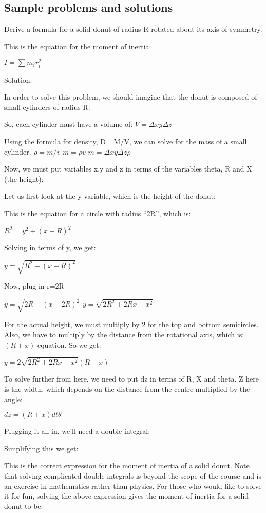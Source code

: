 \subsection{Sample problems and solutions}

\begin{example}{Derive a formula for a solid donut of radius R rotated about its axis of symmetry.}


This is the equation for the moment of inertia:

$I=\sum m_ir_i^{2}$

Solution:

In order to solve this problem, we should imagine that the donut is composed of small cylinders of radius R:


So, each cylinder must have a volume of: $V=\Delta xy\Delta z$

Using the formula for density, D= M/V, we can solve for the mass of a small cylinder.
$\rho=m/v$
$m=\rho v$
$m=\Delta xy\Delta z\rho$

Now, we must put variables x,y and z in terms of the variables theta, R and X (the height);

Let us first look at the y variable, which is the height of the donut;

This is the equation for a circle with radius ``2R'', which is:

$R^{2}=y^{2}+(x-R)^{2}$

Solving in terms of y, we get:

$y=\sqrt{R^{2}-(x-R)^{2}}$

Now, plug in r=2R

$y=\sqrt{2R-(x-2R)^{2}}$
$y=\sqrt{2R^{2}+2Rx-x^{2}}$

For the actual height, we must multiply by 2 for the top and bottom semicircles. Also, we have to multiply by the distance from the rotational axis, which is: $(R+x)$ equation. So we get:

$y=2\sqrt{2R^{2}+2Rx-x^{2}}(R+x)$

To solve further from here, we need to put dz in terms of R, X and theta. Z here is the width, which depends on the distance from the centre multiplied by the angle:

$dz=(R+x)dt\theta$

Plugging it all in, we'll need a double integral:



Simplifying this we get:



This is the correct expression for the moment of inertia of a solid donut. Note that solving complicated double integrals is beyond the scope of the course and is an exercise in mathematics rather than physics. For those who would like to solve it for fun, solving the above expression gives the moment of inertia for a solid donut to be:

\end{example}

